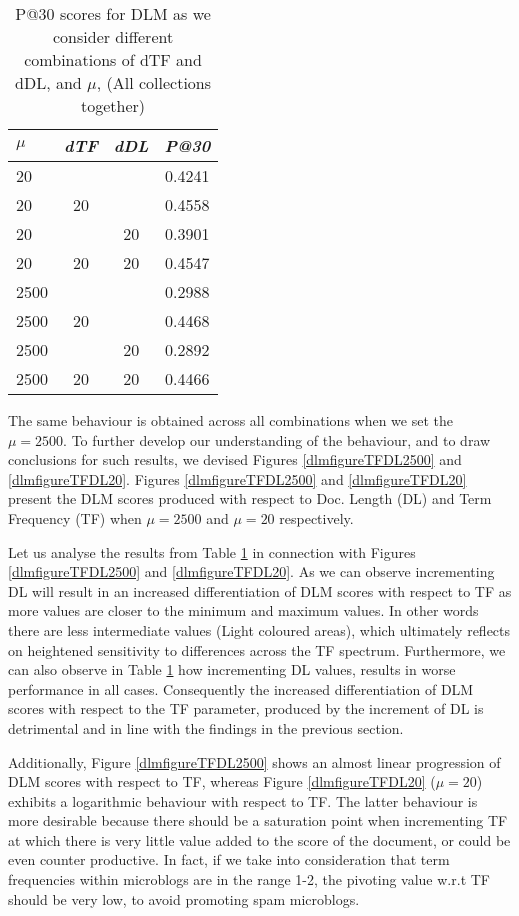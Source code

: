 \begin{table}[]
	\caption{P@30 scores for DLM as we consider different combinations of dTF and dDL, and $\mu$, (All collections together)}
	\centering
	\begin{tabular}{l|c|c|c} 	
	\textit{\textbf{$\mu$}} & 
	\textit{\textbf{dTF}} & 
	\textit{\textbf{dDL}} & 
	\textit{\textbf{P@30}} 	
	\tabularnewline
	\hline
	20 &    &    & 0.4241\\
	20 & 20 &    & 0.4558\\
	20 &    & 20 & 0.3901\\
	20 & 20 & 20 & 0.4547\\
	\hline	
	\hline
	2500 &    &    & 0.2988\\
	2500 & 20 &    & 0.4468\\
	2500 &    & 20 & 0.2892\\
	2500 & 20 & 20 & 0.4466\\
    \hline
	\end{tabular}
	\label{drmdtfmuvalues}
\end{table}

The same behaviour is obtained across all combinations when we set the $\mu = 2500$. To further develop our understanding of the behaviour, and to draw conclusions for such results, we devised Figures \ref{dlmfigureTFDL2500} and \ref{dlmfigureTFDL20}. Figures \ref{dlmfigureTFDL2500} and \ref{dlmfigureTFDL20} present the DLM scores produced with respect to Doc. Length (DL) and Term Frequency (TF) when $\mu=2500$ and $\mu=20$ respectively.

Let us analyse the results from Table \ref{drmdtfmuvalues} in connection with Figures \ref{dlmfigureTFDL2500} and \ref{dlmfigureTFDL20}. As we can observe incrementing DL will result in an increased differentiation of DLM scores with respect to TF as more values are closer to the minimum and maximum values. In other words there are less intermediate values (Light coloured areas), which ultimately reflects on heightened sensitivity to differences across the TF spectrum. Furthermore, we can also observe in Table \ref{drmdtfmuvalues} how incrementing DL values, results in worse performance in all cases. Consequently the increased differentiation of DLM scores with respect to the TF parameter, produced by the increment of DL is detrimental and in line with the findings in the previous section.

Additionally, Figure \ref{dlmfigureTFDL2500} shows an almost linear progression of DLM scores with respect to TF, whereas Figure \ref{dlmfigureTFDL20} ($\mu=20$) exhibits a logarithmic behaviour with respect to TF. The latter behaviour is more desirable because there should be a saturation point when incrementing TF at which there is very little value added to the score of the document, or could be even counter productive. In fact, if we take into consideration that term frequencies within microblogs are in the range 1-2, the pivoting value w.r.t TF should be very low, to avoid promoting spam microblogs.

